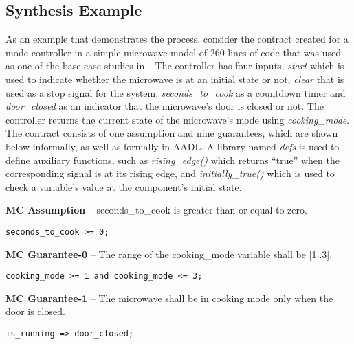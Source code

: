 \subsection{Synthesis Example}
As an example that demonstrates the process, consider the contract created for
a mode controller in a simple microwave model of 260 lines of code that was
used as one of the base case studies in~\cite{Katis15:Realizability}. The
controller has four inputs, \textit{start} which is used to indicate whether the microwave is at an initial
state or not, \textit{clear} that is used as a stop signal for the system,
\textit{seconds\_to\_cook} as a countdown timer and \textit{door\_closed} as an
indicator that the microwave's door is closed or not. The controller returns the
current state of the microwave's mode using \textit{cooking\_mode}. The contract
consists of one assumption and nine guarantees, which are shown below
informally, as well as formally in AADL. A library named \textit{defs} is used
to define auxiliary functions, such as \textit{rising\_edge()} which returns ``true'' when the corresponding signal is at its rising edge, and \textit{initially\_true()} which is used to
check a variable's value at the component's initial state.

\begin{requirement}
\textbf{MC Assumption} -- seconds\_to\_cook is greater than or equal to
zero.
\begin{verbatim}
seconds_to_cook >= 0;
\end{verbatim}
\label{req:micasm}
\end{requirement}
%
\begin{requirement}
\textbf{MC Guarantee-0} -- The range of the cooking\_mode variable shall be
[1..3].
\begin{verbatim}
cooking_mode >= 1 and cooking_mode <= 3;
\end{verbatim}
\label{req:mic0}
\end{requirement}
%
\begin{requirement}
\textbf{MC Guarantee-1} -- The microwave shall be in cooking mode only when the
door is closed.
\begin{Verbatim}[obeytabs,fontsize=\small]
is_running => door_closed;
\end{Verbatim}
\label{req:mic1}
\end{requirement}

